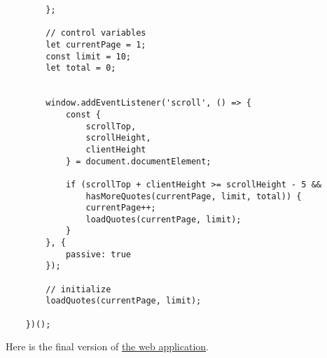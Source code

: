 \documentclass[11pt]{article}
\begin{document}
\begin{lstlisting}
        };

        // control variables
        let currentPage = 1;
        const limit = 10;
        let total = 0;


        window.addEventListener('scroll', () => {
            const {
                scrollTop,
                scrollHeight,
                clientHeight
            } = document.documentElement;

            if (scrollTop + clientHeight >= scrollHeight - 5 &&
                hasMoreQuotes(currentPage, limit, total)) {
                currentPage++;
                loadQuotes(currentPage, limit);
            }
        }, {
            passive: true
        });

        // initialize
        loadQuotes(currentPage, limit);

    })();
\end{lstlisting}

\noindent
Here is the final version of \href{https://www.javascripttutorial.net/sample/dom/infinite-scroll/}{the web application}.
\end{document}

